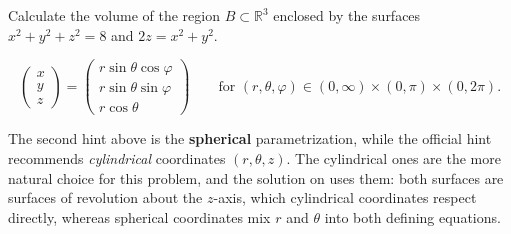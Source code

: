 
\begin{exercise}
\label{ex:paraboloid_hypersurface_volume}
Calculate the volume of the region $B \subset \mathbb{R}^3$ enclosed by the surfaces
$x^2+y^2+z^2=8$ and $2z=x^2+y^2$.

\begin{exercisehint}
\[\begin{pmatrix} x \\ y \\ z\end{pmatrix} = \begin{pmatrix} r\sin\theta\cos\varphi \\
  r\sin\theta\sin\varphi \\ r\cos\theta \end{pmatrix}
  \qquad \text{for } (r,\theta,\varphi) \in (0,\infty)\times(0,\pi)\times(0,2\pi).\]
\end{exercisehint}
\end{exercise}

\begin{ainote}
\label{note:hints_spherical_vs_cylindrical}
The second hint above is the \textbf{spherical} parametrization, while the official hint
recommends \emph{cylindrical} coordinates $(r,\theta,z)$. The cylindrical ones are the more natural
choice for this problem, and the solution on  uses
them: both surfaces are surfaces of revolution about the $z$-axis, which cylindrical coordinates
respect directly, whereas spherical coordinates mix $r$ and $\theta$ into both defining equations.
\end{ainote}


